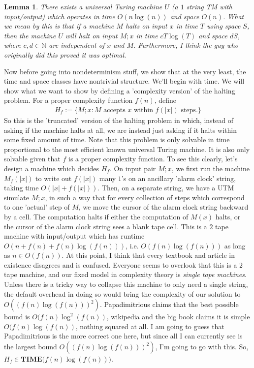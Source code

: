 \documentclass{article}
\theoremstyle{definition}
\theoremstyle{plain}
\theoremstyle{theorem}
\newtheorem{lemma}{Lemma}[section]
\begin{document}
\begin{lemma}
	There exists a universal Turing machine $U$ (a $1$ string TM with input/output) which operates in time $O(n\log(n))$ and space $O(n)$. What we mean by this is that if a machine $M$ halts on input $x$ in time $T$ using space $S$, then the machine $U$ will halt on input $M;x$ in time $cT\log(T)$ and space $dS$, where $c,d \in \mathbb{N}$ are independent of $x$ and $M$. Furthermore, I think the guy who originally did this proved it was optimal. 
\end{lemma}
Now before going into nondeterminism stuff, we show that at the very least, the time and space classes have nontrivial structure. We'll begin with time. We will show what we want to show by defining a 'complexity version' of the halting problem. For a proper complexity function $f(n)$, define 
\begin{align}
	H_f := \{M;x: \textrm{$M$ accepts $x$ within $f(|x|)$ steps.} \}
\end{align}
So this is the 'truncated' version of the halting problem in which, instead of asking if the machine halts at all, we are instead just asking if it halts within some fixed amount of time. Note that this problem is only solvable in time proportional to the most efficient known universal Turing machine. It is also only solvable given that $f$ is a proper complexity function. To see this clearly, let's design a machine which decides $H_f$. On input pair $M;x$, we first run the machine $M_f(|x|)$ to write out $f(|x|)$ many $1$'s on an ancillary 'alarm clock' string, taking time $O(|x|+f(|x|))$. Then, on a separate string, we have a UTM simulate $M;x$, in such a way that for every collection of steps which correspond to one 'actual' step of $M$, we move the cursor of the alarm clock string backward by a cell. The computation halts if either the computation of $M(x)$ halts, or the cursor of the alarm clock string sees a blank tape cell. This is a $2$ tape machine with input/output which has runtime $O(n+f(n)+f(n)\log(f(n)))$, i.e. $O(f(n)\log(f(n)))$ as long as $n \in O(f(n))$. At this point, I think that every textbook and article in existence disagrees and is confused. Everyone seems to overlook that this is a $2$ tape machine, and our fixed model in complexity theory is \textit{single tape machines}. Unless there is a tricky way to collapse this machine to only need a single string, the default overhead in doing so would bring the complexity of our solution to $O((f(n)\log(f(n)))^2)$. Papadimitrious claims that the best possible bound is $O(f(n)\log^2(f(n))$, wikipedia and the big book claims it is simple $O(f(n)\log(f(n))$, nothing squared at all. I am going to guess that Papadimitrious is the more correct one here, but since all I can currently see is the largest bound $O((f(n)\log(f(n)))^2)$, I'm going to go with this. So, $H_f \in \textbf{TIME($f(n)\log(f(n))$)}$.
\end{document}
